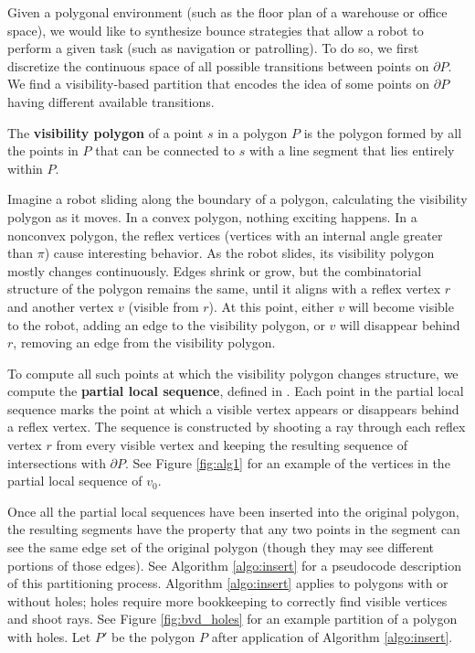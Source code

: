\documentclass[]{styles/svproc}  %
\begin{document}
Given a polygonal environment (such as the floor plan of a warehouse or office
space), we would like to synthesize bounce strategies that allow a robot to
perform a given task (such as navigation or patrolling).
To do so, we first discretize the continuous space of all possible
transitions between points on $\partial P$. We find a visibility-based partition
that encodes the idea of some points on $\partial P$ having different
available transitions.

\begin{definition}
The \textbf{visibility polygon} of a point $s$ in a polygon $P$ is the polygon
formed by all the points in $P$ that can be connected to $s$ with a line
segment that lies entirely within $P$.
\end{definition}

Imagine a robot sliding along the boundary of a polygon, calculating 
the visibility polygon as it moves. In a convex polygon, nothing exciting 
happens. In a nonconvex polygon, the reflex vertices (vertices with an
internal angle greater than $\pi$) cause interesting
behavior.
As the robot slides, its visibility polygon mostly changes continuously. Edges
shrink or grow, but the combinatorial structure of the polygon remains the same,
until it aligns with a reflex vertex $r$ and another vertex $v$ (visible
from $r$). At this point, either 
$v$ will become visible to the robot, adding an edge to the visibility 
polygon, or $v$ will disappear behind $r$, removing an edge from the visibility polygon.

To compute all such points at which the visibility polygon changes structure, we
 compute the \textbf{partial local sequence}, defined in \cite{rourke_viz}.
Each point in the partial local sequence marks the point
at which a visible vertex appears or disappears behind a reflex vertex.
The sequence is constructed by shooting a ray through each reflex vertex $r$ from every
visible vertex and keeping the resulting sequence of intersections with
$\partial P$. See Figure \ref{fig:alg1} for an
example of the vertices in the partial local sequence of $v_0$. 

Once all the partial local sequences have been inserted into the original
polygon, the resulting segments have the property that 
any two points in the segment can see the same edge set of the
original polygon (though they may see different portions of those edges).
See Algorithm \ref{algo:insert} for a pseudocode
description of this partitioning process. Algorithm
\ref{algo:insert} applies to polygons with or without holes; holes 
require more bookkeeping to correctly find visible vertices and shoot
rays. See Figure \ref{fig:bvd_holes} for an example partition of a polygon with
 holes. Let $P'$ be the polygon $P$ after application of Algorithm
\ref{algo:insert}.
\end{document}
